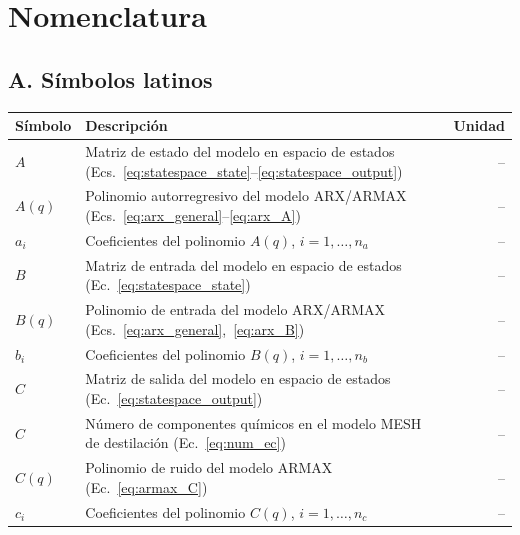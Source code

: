 \section*{Nomenclatura}

\subsection*{A. Símbolos latinos}

\begin{longtable}{@{} l p{} r @{}}
\toprule
\textbf{Símbolo} & \textbf{Descripción} & \textbf{Unidad} \\
\midrule

$A$
  & Matriz de estado del modelo en espacio de estados (Ecs.~\ref{eq:statespace_state}--\ref{eq:statespace_output})
  & -- \\

$A(q)$
  & Polinomio autorregresivo del modelo ARX/ARMAX (Ecs.~\ref{eq:arx_general}--\ref{eq:arx_A})
  & -- \\

$a_i$
  & Coeficientes del polinomio $A(q)$, $i=1,\ldots,n_a$
  & -- \\

$B$
  & Matriz de entrada del modelo en espacio de estados (Ec.~\ref{eq:statespace_state})
  & -- \\

$B(q)$
  & Polinomio de entrada del modelo ARX/ARMAX (Ecs.~\ref{eq:arx_general},~\ref{eq:arx_B})
  & -- \\

$b_i$
  & Coeficientes del polinomio $B(q)$, $i=1,\ldots,n_b$
  & -- \\

$C$
  & Matriz de salida del modelo en espacio de estados (Ec.~\ref{eq:statespace_output})
  & -- \\

$C$
  & Número de componentes químicos en el modelo MESH de destilación (Ec.~\ref{eq:num_ec})
  & -- \\

$C(q)$
  & Polinomio de ruido del modelo ARMAX (Ec.~\ref{eq:armax_C})
  & -- \\

$c_i$
  & Coeficientes del polinomio $C(q)$, $i=1,\ldots,n_c$
  & -- \\


\end{longtable}
